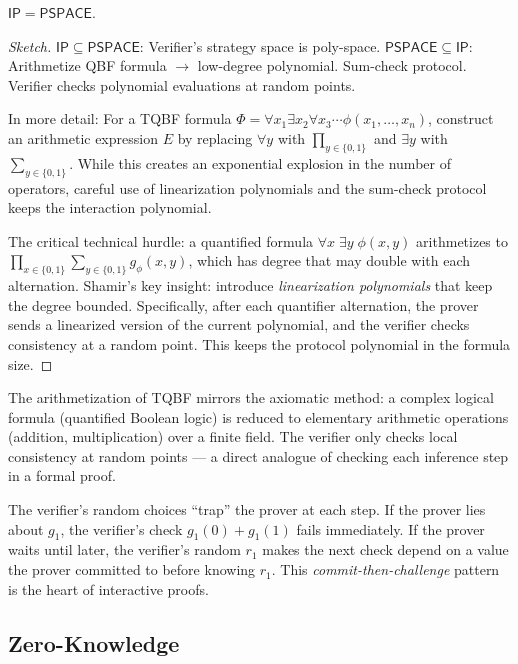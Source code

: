 \begin{theorem}
$\mathsf{IP} = \mathsf{PSPACE}$.
\end{theorem}

\begin{proof}[Sketch]
$\mathsf{IP} \subseteq \mathsf{PSPACE}$: Verifier's strategy space is poly-space.
$\mathsf{PSPACE} \subseteq \mathsf{IP}$: Arithmetize QBF formula $\to$ low-degree polynomial. Sum-check protocol. Verifier checks polynomial evaluations at random points.

In more detail: For a TQBF formula $\Phi = \forall x_1 \exists x_2 \forall x_3 \cdots \phi(x_1,\dots,x_n)$, construct an arithmetic expression $E$ by replacing $\forall y$ with $\prod_{y \in \{0,1\}}$ and $\exists y$ with $\sum_{y \in \{0,1\}}$. While this creates an exponential explosion in the number of operators, careful use of linearization polynomials and the sum-check protocol keeps the interaction polynomial.

The critical technical hurdle: a quantified formula $\forall x\; \exists y\; \phi(x,y)$ arithmetizes to $\prod_{x \in \{0,1\}} \sum_{y \in \{0,1\}} g_\phi(x,y)$, which has degree that may double with each alternation. Shamir's key insight: introduce \emph{linearization polynomials} that keep the degree bounded. Specifically, after each quantifier alternation, the prover sends a linearized version of the current polynomial, and the verifier checks consistency at a random point. This keeps the protocol polynomial in the formula size.
\end{proof}

The arithmetization of TQBF mirrors the axiomatic method: a complex logical formula (quantified Boolean logic) is reduced to elementary arithmetic operations (addition, multiplication) over a finite field. The verifier only checks local consistency at random points --- a direct analogue of checking each inference step in a formal proof.

The verifier's random choices ``trap'' the prover at each step. If the prover lies about $g_1$, the verifier's check $g_1(0) + g_1(1)$ fails immediately. If the prover waits until later, the verifier's random $r_1$ makes the next check depend on a value the prover committed to before knowing $r_1$. This \emph{commit-then-challenge} pattern is the heart of interactive proofs.

\subsection{Zero-Knowledge}
\label{sec:zk:zkdef}

